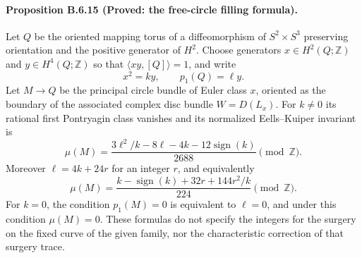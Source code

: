 \paragraph{Proposition B.6.15 (Proved: the free-circle filling formula).}
Let $Q$ be the oriented mapping torus of a diffeomorphism of
$S^2\times S^3$ preserving orientation and the positive generator
of $H^2$.  Choose generators $x\in H^2(Q;\mathbb Z)$ and
$y\in H^4(Q;\mathbb Z)$ so that $\langle xy,[Q]\rangle=1$, and write
\[
 x^2=ky,\qquad p_1(Q)=\ell y.
\]
Let $M\to Q$ be the principal circle bundle of Euler class $x$,
oriented as the boundary of the associated complex disc bundle
$W=D(L_x)$.  For $k\ne0$ its rational first Pontryagin class vanishes
and its normalized Eells--Kuiper invariant is
\[
 \mu(M)=\frac{3\ell^2/k-8\ell-4k-12\operatorname{sign}(k)}{2688}
       \pmod {\mathbb Z}.
 \tag{B.6.26}
\]
Moreover $\ell=4k+24r$ for an integer $r$, and equivalently
\[
 \mu(M)=\frac{k-\operatorname{sign}(k)+32r+144r^2/k}{224}
       \pmod {\mathbb Z}.
\]
For $k=0$, the condition $p_1(M)=0$ is equivalent to $\ell=0$,
and under this condition $\mu(M)=0$.
These formulas do not specify the integers for the surgery on the
fixed curve of the given family, nor the characteristic correction
of that surgery trace.
